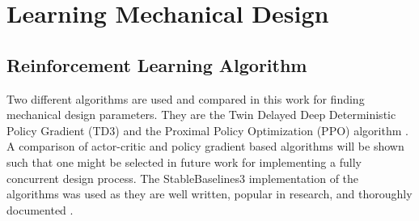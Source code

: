 \documentclass[10pt,twocolumn,letterpaper]{article}
\begin{document}
\section{Learning Mechanical Design}
\label{sec:learning_mech_params}
\subsection{Reinforcement Learning Algorithm}
%
Two different algorithms are used and compared in this work for finding mechanical design parameters. They are the Twin Delayed Deep Deterministic Policy Gradient (TD3) and the Proximal Policy Optimization (PPO) algorithm \cite{Fujimoto2018d, Schulman2017f}. A comparison of actor-critic and policy gradient based algorithms will be shown such that one might be selected in future work for implementing a fully concurrent design process. The StableBaselines3 implementation of the algorithms was used as they are well written, popular in research, and thoroughly documented \cite{stable-baselines3}.
\end{document}
